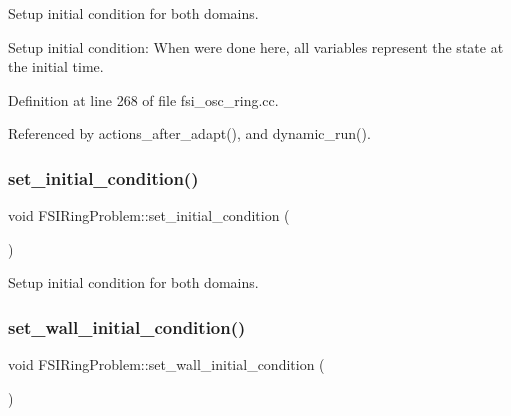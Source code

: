 Setup initial condition for both domains. 

Setup initial condition\+: When we\textquotesingle{}re done here, all variables represent the state at the initial time. 

Definition at line 268 of file fsi\+\_\+osc\+\_\+ring.\+cc.



Referenced by actions\+\_\+after\+\_\+adapt(), and dynamic\+\_\+run().

\mbox{\label{classFSIRingProblem_a309ea4c79fbae58020d94bf2c2318169}} 
\subsubsection{\texorpdfstring{set\+\_\+initial\+\_\+condition()}{set\_initial\_condition()}\hspace{0.1cm}{\footnotesize\ttfamily [2/2]}}
{\footnotesize\ttfamily void F\+S\+I\+Ring\+Problem\+::set\+\_\+initial\+\_\+condition (\begin{DoxyParamCaption}{ }\end{DoxyParamCaption})\hspace{0.3cm}{\ttfamily [private]}}



Setup initial condition for both domains. 

\mbox{\label{classFSIRingProblem_a5f987c1b22dc306cf7d26be7fa74e322}} 
\subsubsection{\texorpdfstring{set\+\_\+wall\+\_\+initial\+\_\+condition()}{set\_wall\_initial\_condition()}\hspace{0.1cm}{\footnotesize\ttfamily [1/2]}}
{\footnotesize\ttfamily void F\+S\+I\+Ring\+Problem\+::set\+\_\+wall\+\_\+initial\+\_\+condition (\begin{DoxyParamCaption}{ }\end{DoxyParamCaption})\hspace{0.3cm}{\ttfamily [private]}}



